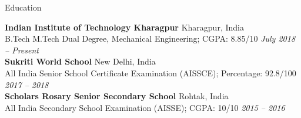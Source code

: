 \documentclass{resume} %
\begin{document}


\begin{rSection}{Education}
\vspace{0.3cm}

{\bf Indian Institute of Technology Kharagpur } \hfill { Kharagpur, India} 
\\ B.Tech M.Tech Dual Degree, Mechanical Engineering; CGPA: 8.85/10 \hfill { \em  July 2018 – Present}
\vspace{0.1cm}
\\
{\bf Sukriti World School } \hfill { New Delhi, India} 
\\ All India Senior School Certificate Examination (AISSCE); Percentage: 92.8/100 \hfill { \em  2017 – 2018}
\vspace{0.1cm}
\\
{\bf Scholars Rosary Senior Secondary School } \hfill { Rohtak, India} 
\\ All India Secondary School Examination (AISSE); CGPA: 10/10 \hfill { \em  2015 – 2016}

\end{rSection}


\end{document}
